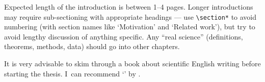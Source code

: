 Expected length of the introduction is between 1--4 pages. Longer introductions may require sub-sectioning with appropriate headings --- use \texttt{\textbackslash{}section*} to avoid numbering (with section names like `Motivation' and `Related work'), but try to avoid lengthy discussion of anything specific. Any ``real science'' (definitions, theorems, methods, data) should go into other chapters.

It is very advisable to skim through a book about scientific English writing before starting the thesis. I~can recommend `' by \citet{glasman2010science}.
\fi